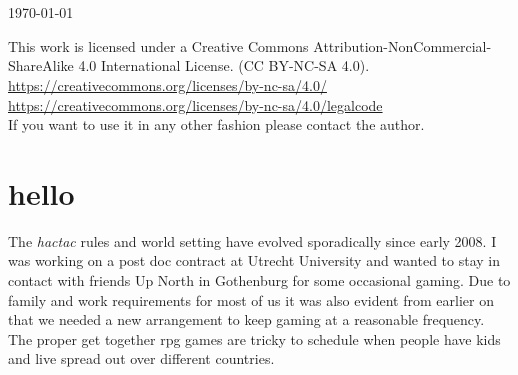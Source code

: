 \documentclass[11pt, twoside, titlepage, a4paper]{report}
\renewcommand{\chaptermark}[1]{\markboth{#1}{}}
\begin{document}
\begin{titlepage}
\begin{center}
   \vfill %


   \ %



   \ %

   \normalsize{\today}

\end{center}


\end{titlepage}




\raggedbottom

This work is licensed under a Creative Commons Attribution-NonCommercial-ShareAlike 4.0 International License. (CC BY-NC-SA 4.0).\\
\url{https://creativecommons.org/licenses/by-nc-sa/4.0/} \\
\url{https://creativecommons.org/licenses/by-nc-sa/4.0/legalcode} \\
If you want to use it in any other fashion please contact the author.






\cleardoublepage %
\raggedbottom

\chaptermark{hello}
\chapter*{hello}

The \emph{hactac} rules and world setting have evolved sporadically since early 2008. I was working on a post doc contract at Utrecht University and wanted to stay in contact with friends Up North in Gothenburg for some occasional gaming. Due to family and work requirements for most of us it was also evident from earlier on that we needed a new arrangement to keep gaming at a reasonable frequency. The proper get together rpg games are tricky to schedule when people have kids and live spread out over different countries.
\end{document}

